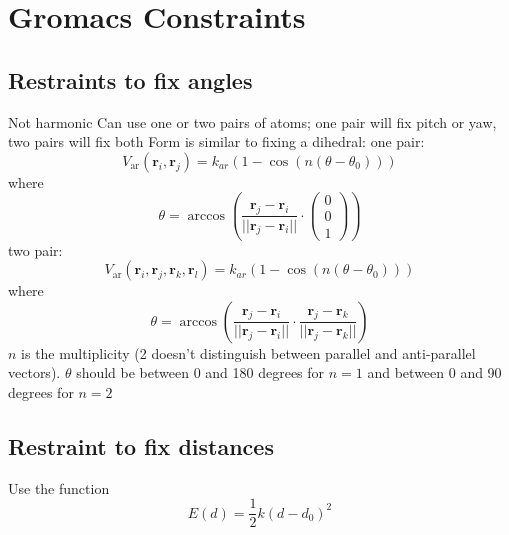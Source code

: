 \documentclass[11pt]{article}
\begin{document}
\section{Gromacs Constraints}
\subsection{Restraints to fix angles}
    \begin{outline}
        \1 Not harmonic
        \1 Can use one or two pairs of atoms; one pair will fix pitch or yaw, two pairs will fix both
        \1 Form is similar to fixing a dihedral:
            \2 one pair:
                \begin{equation}
                    \label{angleConstraint_onePair}
                    V_{\text{ar}}(\mathbf{r}_i, \mathbf{r}_j) = k_{ar}(1-\cos(n(\theta - \theta_0)))
                \end{equation}
                where
                \begin{equation*}
                    \theta = \arccos \left( \frac{\mathbf{r}_j - \mathbf{r}_i}{||\mathbf{r}_j - \mathbf{r}_i||} \cdot \left( \begin{smallmatrix} 0 \\ 0 \\ 1 \end{smallmatrix} \right)\right)
                \end{equation*}
            \2 two pair:
                \begin{equation}
                    \label{angleConstraint_twoPair}
                    V_{\text{ar}}(\mathbf{r}_i, \mathbf{r}_j, \mathbf{r}_k, \mathbf{r}_l) = k_{ar}(1-\cos(n(\theta - \theta_0)))
                \end{equation}
            where
                \begin{equation*}
                    \theta = \arccos \left( \frac{\mathbf{r}_j - \mathbf{r}_i}{||\mathbf{r}_j - \mathbf{r}_i||} \cdot \frac{\mathbf{r}_j - \mathbf{r}_k}{||\mathbf{r}_j - \mathbf{r}_k||}\right)
                \end{equation*}
            \2 $n$ is the multiplicity (2 doesn't distinguish between parallel and anti-parallel vectors). $\theta$ should be between 0 and 180 degrees for $n=1$ and between 0 and 90 degrees for $n=2$
    \end{outline}

\subsection{Restraint to fix distances}
    \begin{outline}
        \1 Use the function
            \begin{equation}
                \label{distConstraint}
                E(d) = \frac{1}{2} k {(d - d_0)}^2
            \end{equation}
    \end{outline}
\end{document}

